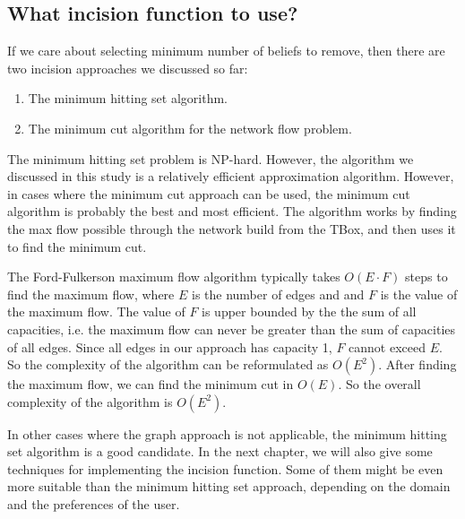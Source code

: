 \subsection{What incision function to use?}
If we care about selecting minimum number of beliefs to remove, then there are two incision approaches we discussed so far:
\begin{enumerate}
\item The minimum hitting set algorithm.
\item The minimum cut algorithm for the network flow problem.
\end{enumerate}
The minimum hitting set problem is NP-hard. However, the algorithm we discussed in this study is a relatively efficient approximation algorithm. However, in cases where the minimum cut approach can be used, the minimum cut algorithm is probably the best and most efficient. The algorithm works by finding the max flow possible through the network build from the TBox, and then uses it to find the minimum cut.

The Ford-Fulkerson maximum flow algorithm typically takes $O(E \cdot F)$ steps to find the maximum flow, where $E$ is the number of edges and and $F$ is the value of the maximum flow. The value of $F$ is upper bounded by the the sum of all capacities, i.e. the maximum flow can never be greater than the sum of capacities of all edges. Since all edges in our approach has capacity 1, $F$ cannot exceed $E$. So the complexity of the algorithm can be reformulated as $O(E^2)$. After finding the maximum flow, we can find the minimum cut in $O(E)$. So the overall complexity of the algorithm is $O(E^2)$.

In other cases where the graph approach is not applicable, the minimum hitting set algorithm is a good candidate. In the next chapter, we will also give some techniques for implementing the incision function. Some of them might be even more suitable than the minimum hitting set approach, depending on the domain and the preferences of the user.
